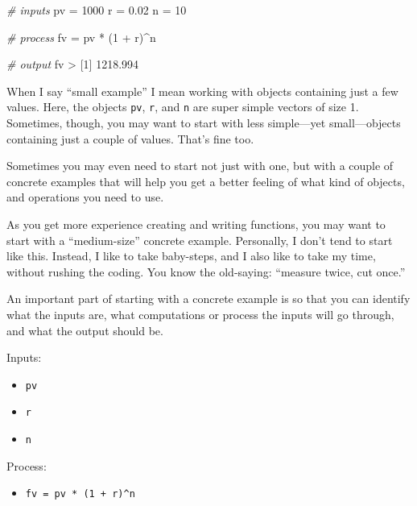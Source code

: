 \documentclass[
]{book}
\newenvironment{Shaded}{\begin{snugshade}}{\end{snugshade}}
\newcommand{\CommentTok}[1]{\textcolor[rgb]{0.56,0.35,0.01}{\textit{#1}}}
\newcommand{\DecValTok}[1]{\textcolor[rgb]{0.00,0.00,0.81}{#1}}
\newcommand{\FloatTok}[1]{\textcolor[rgb]{0.00,0.00,0.81}{#1}}
\newcommand{\NormalTok}[1]{#1}
\newcommand{\OtherTok}[1]{\textcolor[rgb]{0.56,0.35,0.01}{#1}}
\newcommand{\SpecialCharTok}[1]{\textcolor[rgb]{0.00,0.00,0.00}{#1}}
\providecommand{\tightlist}{%
  \setlength{\itemsep}{0pt}\setlength{\parskip}{0pt}}
\begin{document}
\begin{Shaded}
\begin{Highlighting}[]
\CommentTok{\# inputs}
\NormalTok{pv }\OtherTok{=} \DecValTok{1000}
\NormalTok{r }\OtherTok{=} \FloatTok{0.02}
\NormalTok{n }\OtherTok{=} \DecValTok{10}

\CommentTok{\# process}
\NormalTok{fv }\OtherTok{=}\NormalTok{ pv }\SpecialCharTok{*}\NormalTok{ (}\DecValTok{1} \SpecialCharTok{+}\NormalTok{ r)}\SpecialCharTok{\^{}}\NormalTok{n}

\CommentTok{\# output}
\NormalTok{fv}
\SpecialCharTok{\textgreater{}}\NormalTok{ [}\DecValTok{1}\NormalTok{] }\FloatTok{1218.994}
\end{Highlighting}
\end{Shaded}

When I say ``small example'' I mean working with objects containing just a few
values. Here, the objects \texttt{pv}, \texttt{r}, and \texttt{n} are super simple vectors of size 1.
Sometimes, though, you may want to start with less simple---yet small---objects
containing just a couple of values. That's fine too.

Sometimes you may even need to start not just with one, but with a couple of
concrete examples that will help you get a better feeling of what kind of
objects, and operations you need to use.

As you get more experience creating and writing functions, you may want to
start with a ``medium-size'' concrete example. Personally, I don't tend to start
like this. Instead, I like to take baby-steps, and I also like to take my time,
without rushing the coding. You know the old-saying: ``measure twice, cut once.''

An important part of starting with a concrete example is so that you can
identify what the inputs are, what computations or process the inputs will go
through, and what the output should be.

Inputs:

\begin{itemize}
\tightlist
\item
  \texttt{pv}
\item
  \texttt{r}
\item
  \texttt{n}
\end{itemize}

Process:

\begin{itemize}
\tightlist
\item
  \texttt{fv\ =\ pv\ *\ (1\ +\ r)\^{}n}
\end{itemize}
\end{document}
